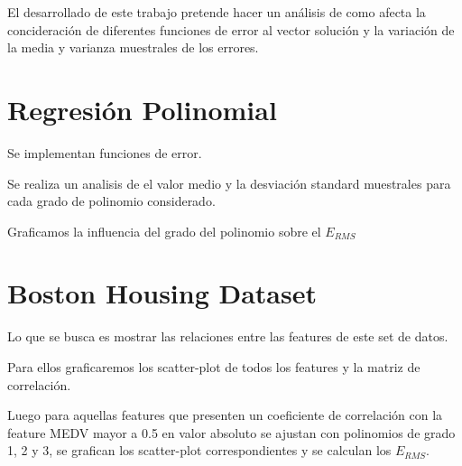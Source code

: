 El desarrollado de este trabajo pretende hacer un análisis de como afecta
la concideración de diferentes funciones de error al vector solución y la 
variación de la media y varianza muestrales de los errores.

\section{Regresión Polinomial}
Se implementan funciones de error.\par
\indent Se realiza un analisis de el valor medio y la desviación 
standard muestrales para cada grado de polinomio considerado.\par
\indent Graficamos la influencia del grado del polinomio
sobre el $E_{RMS}$
\section{Boston Housing Dataset}
Lo que se busca es mostrar las relaciones entre
las features de este set de datos.\par
\indent Para ellos graficaremos los scatter-plot de todos
los features y la matriz de correlación.\par
\indent Luego para aquellas features que presenten
un coeficiente de correlación con la feature MEDV mayor
a 0.5 en valor absoluto se ajustan con polinomios de grado
1, 2 y 3, se grafican los scatter-plot correspondientes
y se calculan los $E_{RMS}$.
